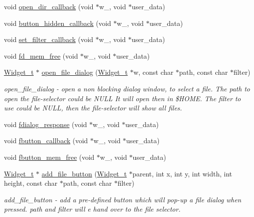 \begin{DoxyCompactItemize}
\item 
void \hyperlink{xfile-dialog_8c_af14ecfde3e66108d2a8aa705a087c5e2}{open\+\_\+dir\+\_\+callback} (void $\ast$w\+\_\+, void $\ast$user\+\_\+data)
\item 
void \hyperlink{xfile-dialog_8c_ab93b20c7d062937b7a8735d7fdcb8c4d}{button\+\_\+hidden\+\_\+callback} (void $\ast$w\+\_\+, void $\ast$user\+\_\+data)
\item 
void \hyperlink{xfile-dialog_8c_a23ce582baea0893e64fd3453ede74184}{set\+\_\+filter\+\_\+callback} (void $\ast$w\+\_\+, void $\ast$user\+\_\+data)
\item 
void \hyperlink{xfile-dialog_8c_a9945e3984b2c178bb5315c7741c0aa6d}{fd\+\_\+mem\+\_\+free} (void $\ast$w\+\_\+, void $\ast$user\+\_\+data)
\item 
\hyperlink{structWidget__t}{Widget\+\_\+t} $\ast$ \hyperlink{xfile-dialog_8c_a50f41466d35761802fb415011006c6e6}{open\+\_\+file\+\_\+dialog} (\hyperlink{structWidget__t}{Widget\+\_\+t} $\ast$w, const char $\ast$path, const char $\ast$filter)
\begin{DoxyCompactList}\small\item\em open\+\_\+file\+\_\+dialog -\/ open a non blocking dialog window, to select a file. The path to open the file-\/selector could be N\+U\+LL It will open then in \$\+H\+O\+ME. The filter to use could be N\+U\+LL, then the file-\/selector will show all files. \end{DoxyCompactList}\item 
void \hyperlink{xfile-dialog_8c_a24ce32d688a2f17b98603983885a8af8}{fdialog\+\_\+response} (void $\ast$w\+\_\+, void $\ast$user\+\_\+data)
\item 
void \hyperlink{xfile-dialog_8c_a0fd7a004894daf98a93e385f57ed4fab}{fbutton\+\_\+callback} (void $\ast$w\+\_\+, void $\ast$user\+\_\+data)
\item 
void \hyperlink{xfile-dialog_8c_a1fee4b5aa1ec75c4f66b4fa4751f4baf}{fbutton\+\_\+mem\+\_\+free} (void $\ast$w\+\_\+, void $\ast$user\+\_\+data)
\item 
\hyperlink{structWidget__t}{Widget\+\_\+t} $\ast$ \hyperlink{xfile-dialog_8c_aa38720181c2a046546d345b60eb6b7b0}{add\+\_\+file\+\_\+button} (\hyperlink{structWidget__t}{Widget\+\_\+t} $\ast$parent, int x, int y, int width, int height, const char $\ast$path, const char $\ast$filter)
\begin{DoxyCompactList}\small\item\em add\+\_\+file\+\_\+button -\/ add a pre-\/defined button which will pop-\/up a file dialog when pressed. path and filter will e hand over to the file selector. \end{DoxyCompactList}\end{DoxyCompactItemize}


